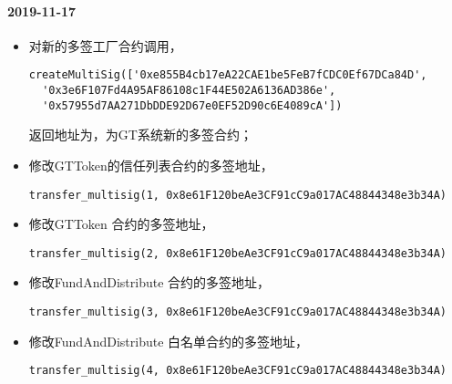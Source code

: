 \paragraph{2019-11-17}
\begin{itemize}
\item 对新的多签工厂合约调用，\\
\begin{verbatim}
createMultiSig(['0xe855B4cb17eA22CAE1be5FeB7fCDC0Ef67DCa84D',
  '0x3e6F107Fd4A95AF86108c1F44E502A6136AD386e',
  '0x57955d7AA271DbDDE92D67e0EF52D90c6E4089cA'])
\end{verbatim}
返回地址为，为GT系统新的多签合约；
\\

\item 修改GTToken的信任列表合约的多签地址，\\
\begin{verbatim}
transfer_multisig(1, 0x8e61F120beAe3CF91cC9a017AC48844348e3b34A)
\end{verbatim}

\item 修改GTToken 合约的多签地址，\\
\begin{verbatim}
transfer_multisig(2, 0x8e61F120beAe3CF91cC9a017AC48844348e3b34A)
\end{verbatim}

\item 修改FundAndDistribute 合约的多签地址，\\
\begin{verbatim}
transfer_multisig(3, 0x8e61F120beAe3CF91cC9a017AC48844348e3b34A)
\end{verbatim}

\item 修改FundAndDistribute 白名单合约的多签地址，\\
\begin{verbatim}
transfer_multisig(4, 0x8e61F120beAe3CF91cC9a017AC48844348e3b34A)
\end{verbatim}

\end{itemize}

